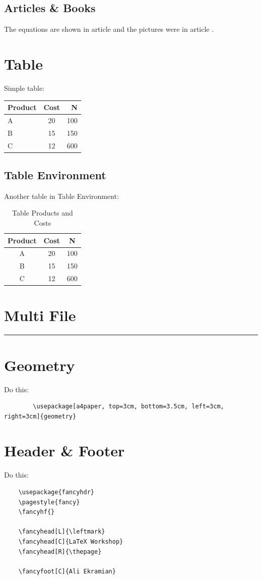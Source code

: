 \documentclass[12pt]{article}
\begin{document}
	\subsection{Articles \& Books}
	The equations are shown in article \cite{article1} and the pictures were in article \cite{article2}.
	
	\section{Table }
	Simple table: \hfill
	\begin{tabular}{lcr}
		Product & Cost & N \\
		\hline
		A & 20 & 100 \\
		B & 15 & 150 \\
		C & 12 & 600
	\end{tabular}
	\subsection{Table Environment}
	Another table in Table Environment:
	\begin{table}[h]
		\centering
			\begin{tabular}{|c|c|c|}
				\hline
			Product & Cost & N \\
			\hline
			A & 20 & 100 \\
			B & 15 & 150 \\
			C & 12 & 600 \\
			\hline
		\end{tabular}
		\caption{Table Products and Costs}
		\label{table1}
	\end{table}
	
	\section{Multi File}
	
	
	
	\rule{\linewidth}{1pt}
	
	\section{Geometry}
	Do this:
	\begin{verbatim}
		\usepackage[a4paper, top=3cm, bottom=3.5cm, left=3cm, right=3cm]{geometry}
	\end{verbatim}
	
	\section{Header \& Footer}
		Do this:
	\begin{verbatim}
	\usepackage{fancyhdr}
	\pagestyle{fancy}
	\fancyhf{}
	
	\fancyhead[L]{\leftmark}
	\fancyhead[C]{LaTeX Workshop}
	\fancyhead[R]{\thepage}
	
	\fancyfoot[C]{Ali Ekramian}
	\end{verbatim}

	
	
	
	
	\pagebreak
	
	

	
	
	

	
	
	
	
	
	
	
	
	
\end{document}
